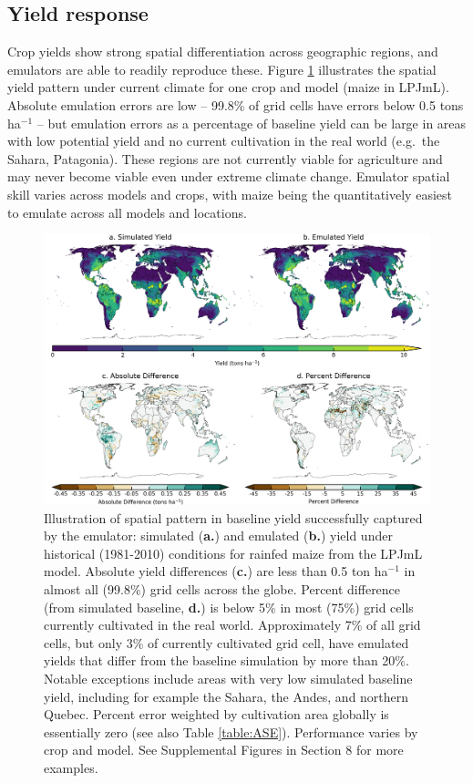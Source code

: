 \documentclass[gmdd]{copernicus} %
\begin{document}
\subsection{Yield response}
\label{S:4.1}
Crop yields show strong spatial differentiation across geographic regions, and emulators are able to readily reproduce these. Figure \ref{fig:map_pattern} illustrates the spatial yield pattern under current climate for one crop and model (maize in LPJmL). Absolute emulation errors are low --  99.8\% of grid cells have errors below 0.5 tons ha$^{-1}$ -- but 
emulation errors as a percentage of baseline yield can be large in areas with low potential yield and no current cultivation in the real world (e.g.\ the Sahara, Patagonia).
These regions are not currently viable for agriculture and may never become viable even under extreme climate change.  
Emulator spatial skill varies across models and crops, with maize being the quantitatively easiest to emulate across all models and locations.

\begin{figure}[ht]
\centering
    \includegraphics[width=16.0cm]{figures/lpjml_maize.png}
    \caption{
    Illustration of spatial pattern in baseline yield successfully captured by the emulator:
    simulated (\textbf{a.}) and emulated (\textbf{b.}) yield under historical (1981-2010) conditions for rainfed maize from the LPJmL model.
    Absolute yield differences (\textbf{c.}) are less than 0.5 ton ha$^{-1}$ in almost all (99.8\%) grid cells across the globe.
    Percent difference (from simulated baseline, \textbf{d.}) is below 5\% in most (75\%) grid cells currently cultivated in the real world.
    Approximately 7\% of all grid cells, but only 3\% of currently cultivated grid cell, have emulated yields that differ from the baseline simulation by more than 20\%.
    Notable exceptions include areas with very low simulated baseline yield, including for example the Sahara, the Andes, and northern Quebec. 
    Percent error weighted by cultivation area globally is essentially zero (see also Table \ref{table:ASE}).
    Performance varies by crop and model. 
    See Supplemental Figures in Section 8 for more examples.
    }
   \label{fig:map_pattern}
\end{figure}
\end{document}

